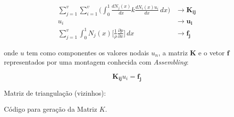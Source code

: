 \begin{align}
	\sum\limits_{j=1}^v
	\sum\limits_{i=1}^v 
	\bigg(
	\int_{0}^{1}  
	\frac{dN_j(x)}{dx} 
	k
	\frac{d N_i(x) u_i}{dx} 
	\, dx
	\bigg)
	&\longrightarrow
	\mathbf{K_{ij}}
	\\
	u_i
	&\longrightarrow
	\mathbf{u_{i}}
	\\
	\sum\limits_{j=1}^v
	\int_{0}^{1}  
	N_j(x) 
	\bigg[ \frac{1}{\rho} \frac{\partial p}{\partial x} \bigg]
	\, dx
	&\longrightarrow
	\mathbf{f_{j}}
\end{align}


\noindent onde $u$ tem como componentes os valores nodais $u_n$, a
matriz $\mathbf{K}$ e o vetor $\mathbf{f}$ representados por uma
montagem conhecida com \emph{Assembling}:

\begin{equation}
	\mathbf{K_{ij}} u_i = \mathbf{f_j} 
\end{equation}

Matriz de triangulação (vizinhos):

\vspace{1cm}

Código para geração da Matriz $K$.





